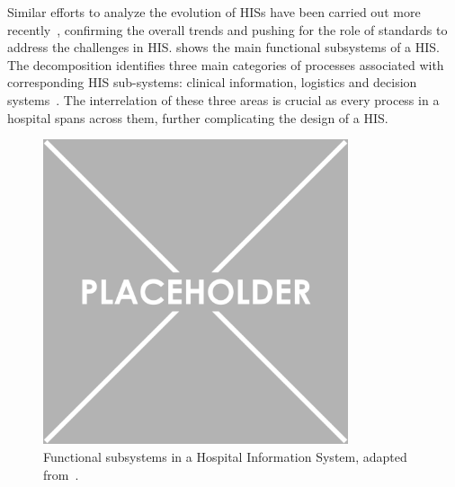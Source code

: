 Similar efforts to analyze the evolution of \acp{HIS} have been carried out more recently~\cite{Balaraman_Kosalram_2013,Degoulet_2014}, confirming the overall trends and pushing for the role of standards to address the challenges in \ac{HIS}.
%
 shows the main functional subsystems of a \ac{HIS}. 
The decomposition identifies three main categories of processes associated with corresponding \ac{HIS} sub-systems: clinical information, logistics and decision systems~\cite{Degoulet_2014}.
%
The interrelation of these three areas is crucial as every process in a hospital spans across them, further complicating the design of a \ac{HIS}.


\begin{figure}[t]
    \centering
    \includegraphics[width=0.8\textwidth]{figures/placeholder.png} 
    \caption{Functional subsystems in a Hospital Information System, adapted from~\cite{Degoulet_2014}.}
    \label{fig:his-functional}
\end{figure}

